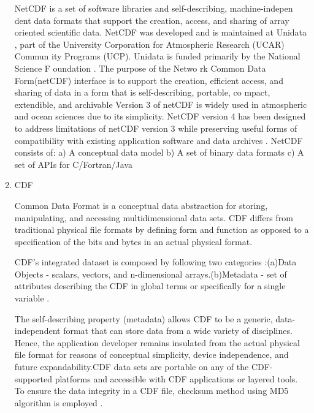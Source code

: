 \begin{enumerate}
NetCDF is a set of software libraries and self-describing,
machine-indepen dent data formats that support the creation,
access, and sharing of array oriented scientific data. NetCDF was
developed and is maintained at Unidata , part of the University
Corporation for Atmospheric Research (UCAR) Commun ity Programs
(UCP). Unidata is funded primarily by the National Science F
oundation \label{\detokenize{i524/technologies:id474}}{\hyperref[\detokenize{i524/technologies:paper-netcdf}]{\sphinxcrossref{{[}407{]}}}} \label{\detokenize{i524/technologies:id475}}{\hyperref[\detokenize{i524/technologies:www-netcdf}]{\sphinxcrossref{{[}408{]}}}} . The purpose
of the Netwo rk Common Data Form(netCDF) interface is to support
the creation, efficient access, and sharing of data in a form
that is self-describing, portable, co mpact, extendible, and
archivable Version 3 of netCDF is widely used in atmospheric and
ocean sciences due to its simplicity. NetCDF version 4 has been
designed to address limitations of netCDF version 3 while
preserving useful forms of compatibility with existing
application software and data archives \label{\detokenize{i524/technologies:id476}}{\hyperref[\detokenize{i524/technologies:paper-netcdf}]{\sphinxcrossref{{[}407{]}}}}.
NetCDF consists of: a) A conceptual data model b) A set of binary
data formats c) A set of APIs for C/Fortran/Java

\item {} 
CDF

Common Data Format \label{\detokenize{i524/technologies:id477}}{\hyperref[\detokenize{i524/technologies:www-cdf}]{\sphinxcrossref{{[}409{]}}}} is a conceptual data
abstraction for storing, manipulating, and accessing
multidimensional data sets. CDF differs from traditional physical
file formats by defining form and function as opposed to a
specification of the bits and bytes in an actual physical format.

CDF's integrated dataset is composed by following two categories
:(a)Data Objects - scalars, vectors, and n-dimensional
arrays.(b)Metadata - set of attributes describing the CDF in
global terms or specifically for a single variable
\label{\detokenize{i524/technologies:id478}}{\hyperref[\detokenize{i524/technologies:user-guide-cdf}]{\sphinxcrossref{{[}410{]}}}}.

The self-describing property (metadata) allows CDF to be a
generic, data-independent format that can store data from a wide
variety of disciplines. Hence, the application developer remains
insulated from the actual physical file format for reasons of
conceptual simplicity, device independence, and future
expandability.CDF data sets are portable on any of the
CDF-supported platforms and accessible with CDF applications or
layered tools. To ensure the data integrity in a CDF file,
checksum method using MD5 algorithm is employed
\label{\detokenize{i524/technologies:id479}}{\hyperref[\detokenize{i524/technologies:www-digitalpreserve}]{\sphinxcrossref{{[}411{]}}}}.


\end{enumerate}

